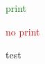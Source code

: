 \documentclass{classe-tex3R-2-1}
\begin{document}
\bigskip

\ifprint \textcolor{green}{print}\par \else \hfill \textcolor{red}{no} \textcolor{red}{print}\par \fi






\newpage test
\end{document}
